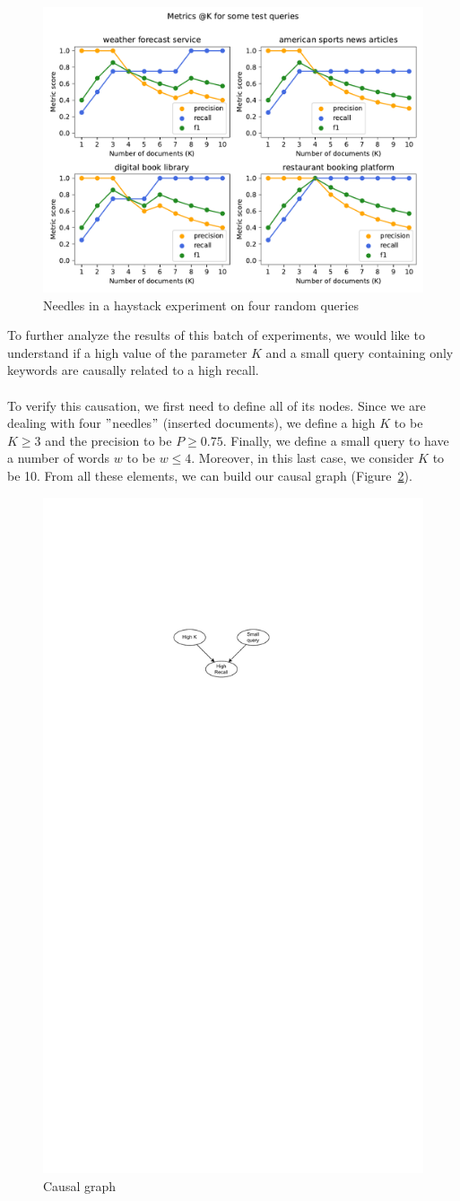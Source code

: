 \begin{figure}[!h]
    \begin{center}
        \includegraphics[width=0.8\linewidth]{assets/pdf/evaluation/prec-rec-queries}
    \end{center}

    \caption{Needles in a haystack experiment on four random queries}
    \label{fig:nh-1}
\end{figure}

\noindent To further analyze the results of this batch of experiments, we would like to understand if a high value of the parameter $K$ and a small query containing only keywords are causally related to a high recall. \\ \\
To verify this causation, we first need to define all of its nodes.
Since we are dealing with four \("\)needles\("\) (inserted documents), we define a high $K$ to be $K\geq3$ and the precision to be $P\geq0.75$.
Finally, we define a small query to have a number of words $w$ to be $w\leq4$.
Moreover, in this last case, we consider $K$ to be 10.
From all these elements, we can build our causal graph (Figure~\ref{fig:dag-1}).

\begin{figure}[!h]
    \begin{center}
        \includegraphics[width=0.3\linewidth]{assets/pdf/evaluation/dag-rec}
    \end{center}

    \caption{Causal graph}
    \label{fig:dag-1}
\end{figure}

